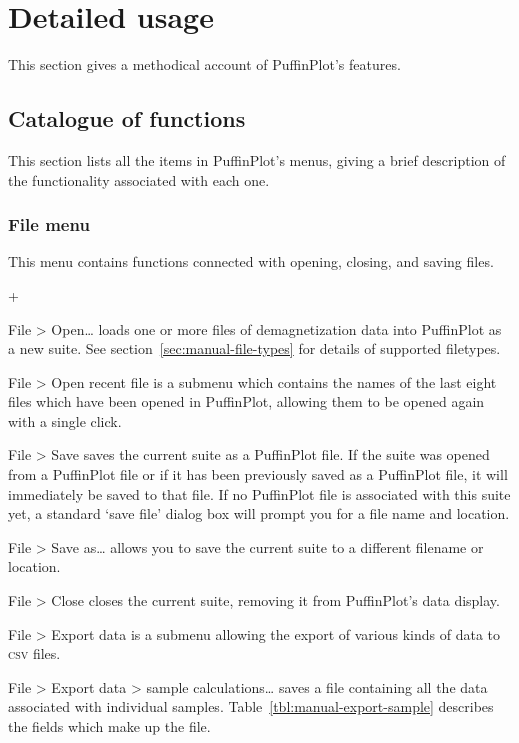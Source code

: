 \documentclass[a4paper]{article}
\newcommand{\menuitemlabel}[1]{%
\mbox{\textsf{#1}}\hfil}
\newenvironment{menuitemlist}%
{\begin{list}{}{%
\renewcommand{\makelabel}{\menuitemlabel}%
\setlength{\labelwidth}{35pt}%
\setlength{\leftmargin}%
             {\labelwidth+\labelsep}}}%
{\end{list}}
\newcommand{\caps}[1]{\textsc{#1}} %
\newcommand{\submenu}{ \textgreater{} } %
\begin{document}
\section{Detailed usage}

This section gives a methodical account of PuffinPlot's features.

\subsection{Catalogue of functions}

This section lists all the items in PuffinPlot's menus, giving a brief
description of the functionality associated with each one.

\subsubsection{File menu}

This menu contains functions connected with opening, closing, and
saving files.

\begin{menuitemlist}

\item[File\submenu Open…] loads one or more files of demagnetization data into
  PuffinPlot as a new suite. See section~\ref{sec:manual-file-types} for
  details of supported filetypes.

\item[File\submenu Open recent file] is a submenu which
contains the names of the last eight files which have been opened in
PuffinPlot, allowing them to be opened again with a single click.

\item[File\submenu Save] saves the current suite as a PuffinPlot file. If
the suite was opened from a PuffinPlot file or if it has been previously
saved as a PuffinPlot file, it will immediately be saved to that file. If no
PuffinPlot file is associated with this suite yet, a standard ‘save file’
dialog box will prompt you for a file name and location.

\item[File\submenu Save as…] allows you to save the current suite to a
different filename or location.

\item[File\submenu Close] closes the current suite, removing it from
PuffinPlot's data display.

\item[File\submenu Export data] is a submenu allowing the export of
various kinds of data to \caps{csv} files.

\item[File\submenu Export data\submenu sample calculations…] saves a file
containing all the data associated with individual samples.
Table~\ref{tbl:manual-export-sample} describes the fields which make
up the file.

\end{menuitemlist}



\end{document}
